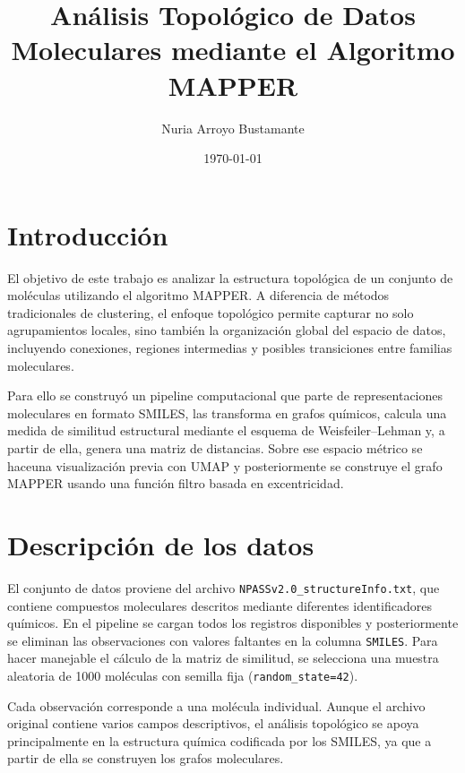 \documentclass[12pt]{article}
\title{An\'alisis Topol\'ogico de Datos Moleculares mediante el Algoritmo MAPPER}
\author{Nuria Arroyo Bustamante}
\date{\today}
\begin{document}
\maketitle

\onehalfspacing

\section{Introducci\'on}

El objetivo de este trabajo es analizar la estructura topol\'ogica de un conjunto de mol\'eculas utilizando el algoritmo MAPPER. A diferencia de m\'etodos tradicionales de clustering, el enfoque topol\'ogico permite capturar no solo agrupamientos locales, sino tambi\'en la organizaci\'on global del espacio de datos, incluyendo conexiones, regiones intermedias y posibles transiciones entre familias moleculares.

Para ello se construy\'o un pipeline computacional que parte de representaciones moleculares en formato SMILES, las transforma en grafos qu\'imicos, calcula una medida de similitud estructural mediante el esquema de Weisfeiler--Lehman y, a partir de ella, genera una matriz de distancias. Sobre ese espacio m\'etrico se haceuna visualizaci\'on previa con UMAP y posteriormente se construye el grafo MAPPER usando una funci\'on filtro basada en excentricidad.

\section{Descripci\'on de los datos}

El conjunto de datos proviene del archivo \texttt{NPASSv2.0\_structureInfo.txt}, que contiene compuestos moleculares descritos mediante diferentes identificadores qu\'imicos. En el pipeline se cargan todos los registros disponibles y posteriormente se eliminan las observaciones con valores faltantes en la columna \texttt{SMILES}. Para hacer manejable el c\'alculo de la matriz de similitud, se selecciona una muestra aleatoria de 1000 mol\'eculas con semilla fija (\texttt{random\_state=42}).

Cada observaci\'on corresponde a una mol\'ecula individual. Aunque el archivo original contiene varios campos descriptivos, el an\'alisis topol\'ogico se apoya principalmente en la estructura qu\'imica codificada por los SMILES, ya que a partir de ella se construyen los grafos moleculares.
\end{document}
